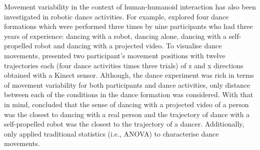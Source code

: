 Movement variability in the context of human-humanoid interaction has also been
investigated in robotic dance activities.
For example, \cite{tsuchida2013} explored four dance formations which were 
performed three times by nine participants who had three years of experience: 
dancing with a robot, dancing alone, dancing with a self-propelled robot and 
dancing with a projected video.
To visualise dance movements, \cite{tsuchida2013} presented two participant's 
movement positions with twelve trajectories each (four dance activities times 
three trials) of z and x directions obtained with a Kinect sensor.
Although, the dance experiment was rich in terms of movement variability
for both participants and dance activities, only distance between each of 
the conditions in the dance formation was considered. 
With that in mind, \cite{tsuchida2013} concluded that the sense 
of dancing with a projected video of a person was the closest 
to dancing with a real person and the trajectory of dance with 
a self-propelled robot was the closest to the trajectory of a dancer. 
Additionally, \cite{tsuchida2013} only applied 
traditional statistics (i.e., ANOVA) to characterise dance movements.

